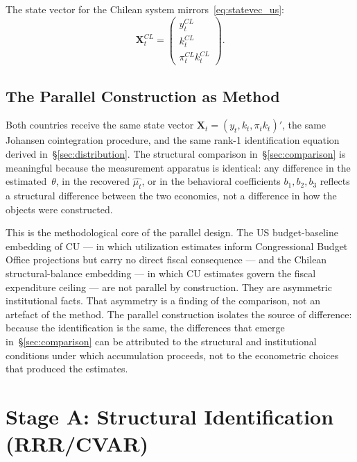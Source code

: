 \documentclass[12pt,letterpaper]{article}
\newcommand{\mut}{\mu_t}           %
\newcommand{\pit}{\pi_t}           %
\begin{document}
The state vector for the Chilean system mirrors~\eqref{eq:statevec_us}:
\begin{equation}
  \mathbf{X}_t^{CL} = \begin{pmatrix} y^{CL}_t \\ k^{CL}_t \\ \pi^{CL}_t k^{CL}_t \end{pmatrix}.
  \label{eq:statevec_cl}
\end{equation}


\subsection{The Parallel Construction as Method}
\label{sec:bridge_method}

Both countries receive the same state vector
$\mathbf{X}_t = (y_t, k_t, \pit k_t)'$, the same Johansen cointegration
procedure, and the same rank-1 identification equation derived
in~\S\ref{sec:distribution}. The structural comparison
in~\S\ref{sec:comparison} is meaningful because the measurement apparatus is
identical: any difference in the estimated~$\theta$, in the recovered
$\widehat{\mut}$, or in the behavioral coefficients $b_1, b_2, b_3$ reflects a
structural difference between the two economies, not a difference in how the
objects were constructed.

This is the methodological core of the parallel design. The US budget-baseline
embedding of CU --- in which utilization estimates inform Congressional Budget
Office projections but carry no direct fiscal consequence --- and the Chilean
structural-balance embedding --- in which CU estimates govern the fiscal
expenditure ceiling --- are not parallel by construction. They are asymmetric
institutional facts. That asymmetry is a finding of the comparison, not an
artefact of the method. The parallel construction isolates the source of
difference: because the identification is the same, the differences that emerge
in~\S\ref{sec:comparison} can be attributed to the structural and institutional
conditions under which accumulation proceeds, not to the econometric choices
that produced the estimates.


\section{Stage A: Structural Identification (RRR/CVAR)}
\label{sec:stageA}
\end{document}

